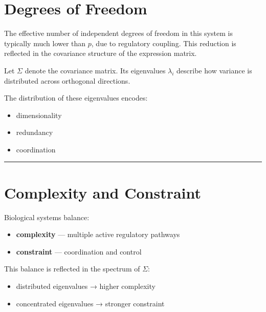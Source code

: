 \documentclass[
  letterpaper,
  DIV=11,
  numbers=noendperiod,
  openany,
  oneside]{scrreprt}
\providecommand{\tightlist}{%
  \setlength{\itemsep}{0pt}\setlength{\parskip}{0pt}}
\begin{document}
\section{Degrees of Freedom}\label{degrees-of-freedom}

The effective number of independent degrees of freedom in this system is
typically much lower than \(p\), due to regulatory coupling. This
reduction is reflected in the covariance structure of the expression
matrix.

Let \(\Sigma\) denote the covariance matrix. Its eigenvalues
\(\lambda_i\) describe how variance is distributed across orthogonal
directions.

The distribution of these eigenvalues encodes:

\begin{itemize}
\tightlist
\item
  dimensionality\\
\item
  redundancy\\
\item
  coordination
\end{itemize}

\begin{center}\rule{0.5\linewidth}{0.5pt}\end{center}

\section{Complexity and Constraint}\label{complexity-and-constraint}

Biological systems balance:

\begin{itemize}
\tightlist
\item
  \textbf{complexity} --- multiple active regulatory pathways\\
\item
  \textbf{constraint} --- coordination and control
\end{itemize}

This balance is reflected in the spectrum of \(\Sigma\):

\begin{itemize}
\tightlist
\item
  distributed eigenvalues → higher complexity\\
\item
  concentrated eigenvalues → stronger constraint
\end{itemize}
\end{document}
